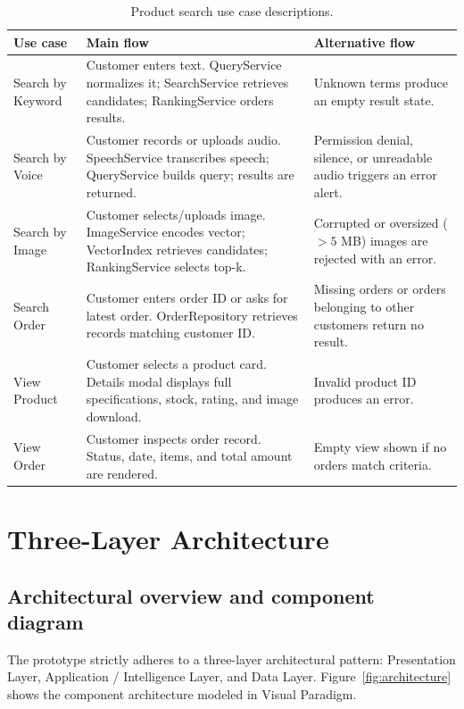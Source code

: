 \documentclass[12pt,a4paper]{article}
\begin{document}
\begin{table}[H]\centering\small
\caption{Product search use case descriptions.}\label{tab:uc}
\begin{tabularx}{\textwidth}{@{}p{32mm}LL@{}}\toprule
\textbf{Use case} & \textbf{Main flow} & \textbf{Alternative flow} \\\midrule
Search by Keyword & Customer enters text. QueryService normalizes it; SearchService retrieves candidates; RankingService orders results. & Unknown terms produce an empty result state. \\
Search by Voice & Customer records or uploads audio. SpeechService transcribes speech; QueryService builds query; results are returned. & Permission denial, silence, or unreadable audio triggers an error alert. \\
Search by Image & Customer selects/uploads image. ImageService encodes vector; VectorIndex retrieves candidates; RankingService selects top-k. & Corrupted or oversized ($>5$ MB) images are rejected with an error. \\
Search Order & Customer enters order ID or asks for latest order. OrderRepository retrieves records matching customer ID. & Missing orders or orders belonging to other customers return no result. \\
View Product & Customer selects a product card. Details modal displays full specifications, stock, rating, and image download. & Invalid product ID produces an error. \\
View Order & Customer inspects order record. Status, date, items, and total amount are rendered. & Empty view shown if no orders match criteria. \\
\bottomrule\end{tabularx}\end{table}

\FloatBarrier
\section{Three-Layer Architecture}\label{sec:architecture}

\subsection{Architectural overview and component diagram}
The prototype strictly adheres to a three-layer architectural pattern: Presentation Layer, Application / Intelligence Layer, and Data Layer. Figure~\ref{fig:architecture} shows the component architecture modeled in Visual Paradigm.
\end{document}
